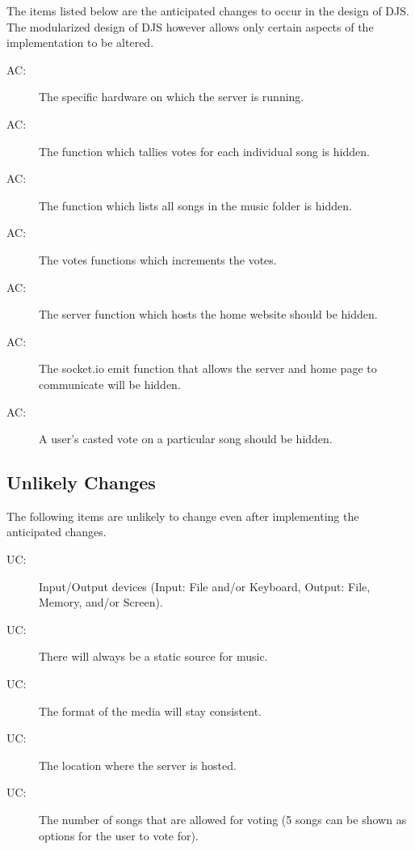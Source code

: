 \documentclass[12pt, titlepage]{article}
\newcounter{acnum}
\newcommand{\actheacnum}{AC\theacnum}
\newcounter{ucnum}
\newcommand{\uctheucnum}{UC\theucnum}
\begin{document}
The items listed below are the anticipated changes to occur in the design of DJS. The modularized design of DJS however allows only certain aspects of the implementation to be altered.


\begin{description}
\item[ \actheacnum \label{ac1}:] The specific hardware on which the server is running.
\item[ \actheacnum \label{ac2}:] The function which tallies votes for each individual song is hidden.
\item[ \actheacnum \label{ac3}:] The function which lists all songs in the music folder is hidden.
\item[ \actheacnum \label{ac4}:] The votes functions which increments the votes.  
\item[ \actheacnum \label{ac5}:] The server function which hosts the home website should be hidden.
\item[ \actheacnum \label{ac6}:] The socket.io emit function that allows the server and home page to communicate will be hidden.
\item[ \actheacnum \label{ac7}:] A user's casted vote on a particular song should be hidden.
\end{description}


\subsection{Unlikely Changes} \label{SecUchange}
The following items are unlikely to change even after implementing the anticipated changes.


\begin{description}
\item[ \uctheucnum \label{ucIO}:] Input/Output devices
 (Input: File and/or Keyboard, Output: File, Memory, and/or Screen).
\item[ \uctheucnum \label{ucInput}:] There will always be a static source for music.
\item[ \uctheucnum \label{ucInput}:] The format of the media will stay consistent.
\item[ \uctheucnum \label{ucInput}:] The location where the server is hosted.
\item[ \uctheucnum \label{ucInput}:] The number of songs that are allowed for voting (5 songs can be shown as options for the user to vote for).
\end{description}
\end{document}
